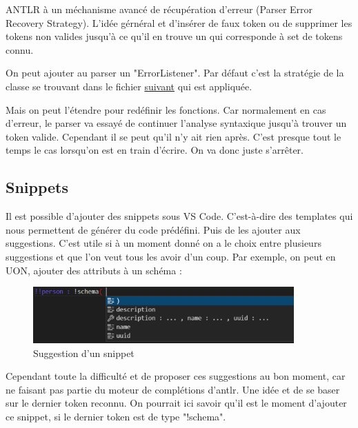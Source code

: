 \documentclass[
    iict, %
    il, %
]{heig-tb}
\begin{document}
ANTLR à un méchanisme avancé de récupération d'erreur (Parser Error Recovery Strategy).
L'idée gérnéral et d'insérer de faux token ou de supprimer les tokens non valides jusqu'à ce qu'il en trouve un qui corresponde à set de tokens connu.


On peut ajouter au parser un "ErrorListener".
Par défaut c'est la stratégie de la classe se trouvant dans le fichier \href{https://github.com/tunnelvisionlabs/antlr4ts/blob/master/src/DefaultErrorStrategy.ts}{suivant} qui est appliquée.

Mais on peut l'étendre pour redéfinir les fonctions.
Car normalement en cas d'erreur, le parser va essayé de continuer l'analyse syntaxique jusqu'à trouver un token valide.
Cependant il se peut qu'il n'y ait rien après. C'est presque tout le temps le cas lorsqu'on est en train d'écrire.
On va donc juste s'arrêter.

\subsection{Snippets}
Il est possible d'ajouter des snippets sous VS Code. C'est-à-dire des templates qui nous permettent de générer du code prédéfini. Puis de les ajouter aux suggestions.
C'est utile si à un moment donné on a le choix entre plusieurs suggestions et que l'on veut tous les avoir d'un coup.
Par exemple, on peut en UON, ajouter des attributs à un schéma :

\begin{figure}[!h]
    \begin{center}
        \includegraphics[width=10cm]{assets/figures/snippet-suggestion.png}
    \end{center}
    \caption[Suggestion d'un snippet]{\label{snippet-suggestion} Suggestion d'un snippet}
\end{figure}

Cependant toute la difficulté et de proposer ces suggestions au bon moment, car ne faisant pas partie du moteur de complétions d'antlr. Une idée et de se baser sur le dernier token reconnu. On pourrait ici savoir qu'il est le moment d'ajouter ce snippet, si le dernier token est de type "!schema".
\end{document}
